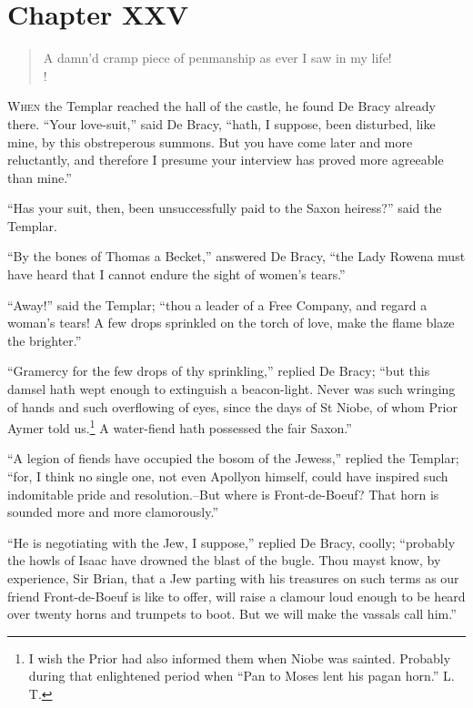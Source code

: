\chapter{Chapter XXV}

\begin{verse}
A damn'd cramp piece of penmanship as ever I saw in my life!\\!
\end{verse}

\lettrine{W}{hen} the Templar reached the hall of the castle, he found
De Bracy
already there. ``Your love-suit,'' said De Bracy, ``hath, I suppose,
been disturbed, like mine, by this obstreperous summons. But you have
come later and more reluctantly, and therefore I presume your interview
has proved more agreeable than mine.''

``Has your suit, then, been unsuccessfully paid to the Saxon heiress?''
said the Templar.

``By the bones of Thomas a Becket,'' answered De Bracy, ``the Lady
Rowena must have heard that I cannot endure the sight of women's
tears.''

``Away!'' said the Templar; ``thou a leader of a Free Company, and
regard a woman's tears! A few drops sprinkled on the torch of love, make
the flame blaze the brighter.''

``Gramercy for the few drops of thy sprinkling,'' replied De Bracy;
``but this damsel hath wept enough to extinguish a beacon-light. Never
was such wringing of hands and such overflowing of eyes, since the days
of St Niobe, of whom Prior Aymer told us.\footnote{I wish the Prior had
also informed them when Niobe was
sainted. Probably during that enlightened period when ``Pan to Moses
lent his pagan horn.'' L. T.} A water-fiend hath
possessed the fair Saxon.''

``A legion of fiends have occupied the bosom of the Jewess,'' replied
the Templar; ``for, I think no single one, not even Apollyon himself,
could have inspired such indomitable pride and resolution.--But where is
Front-de-Boeuf? That horn is sounded more and more clamorously.''

``He is negotiating with the Jew, I suppose,'' replied De Bracy, coolly;
``probably the howls of Isaac have drowned the blast of the bugle. Thou
mayst know, by experience, Sir Brian, that a Jew parting with his
treasures on such terms as our friend Front-de-Boeuf is like to offer,
will raise a clamour loud enough to be heard over twenty horns and
trumpets to boot. But we will make the vassals call him.''

